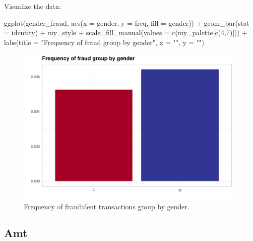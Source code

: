 \documentclass[
]{report}
\newenvironment{Shaded}{\begin{snugshade}}{\end{snugshade}}
\newcommand{\AttributeTok}[1]{\textcolor[rgb]{0.77,0.63,0.00}{#1}}
\newcommand{\DecValTok}[1]{\textcolor[rgb]{0.00,0.00,0.81}{#1}}
\newcommand{\FunctionTok}[1]{\textcolor[rgb]{0.00,0.00,0.00}{#1}}
\newcommand{\NormalTok}[1]{#1}
\newcommand{\SpecialCharTok}[1]{\textcolor[rgb]{0.00,0.00,0.00}{#1}}
\newcommand{\StringTok}[1]{\textcolor[rgb]{0.31,0.60,0.02}{#1}}
\begin{document}
Visualize the data:

\begin{Shaded}
\begin{Highlighting}[]
\FunctionTok{ggplot}\NormalTok{(gender\_fraud, }\FunctionTok{aes}\NormalTok{(}\AttributeTok{x =}\NormalTok{ gender, }\AttributeTok{y =}\NormalTok{ freq, }\AttributeTok{fill =}\NormalTok{ gender)) }\SpecialCharTok{+}
  \FunctionTok{geom\_bar}\NormalTok{(}\AttributeTok{stat =} \StringTok{\textquotesingle{}identity\textquotesingle{}}\NormalTok{) }\SpecialCharTok{+}
\NormalTok{  my\_style }\SpecialCharTok{+}
  \FunctionTok{scale\_fill\_manual}\NormalTok{(}\AttributeTok{values =} \FunctionTok{c}\NormalTok{(my\_palette[}\FunctionTok{c}\NormalTok{(}\DecValTok{4}\NormalTok{,}\DecValTok{7}\NormalTok{)])) }\SpecialCharTok{+}
  \FunctionTok{labs}\NormalTok{(}\AttributeTok{title =} \StringTok{"Frequency of fraud group by gender"}\NormalTok{,}
       \AttributeTok{x =} \StringTok{""}\NormalTok{,}
       \AttributeTok{y =} \StringTok{""}\NormalTok{)}
\end{Highlighting}
\end{Shaded}

\begin{figure}
\centering
\includegraphics{credit_card_fraud_detection_files/figure-latex/gender_plot -1.pdf}
\caption{\label{Fig:gender_plot}Frequency of fraudulent transactions
group by gender.}
\end{figure}

\hypertarget{amt}{%
\subsection{Amt}\label{amt}}
\end{document}
